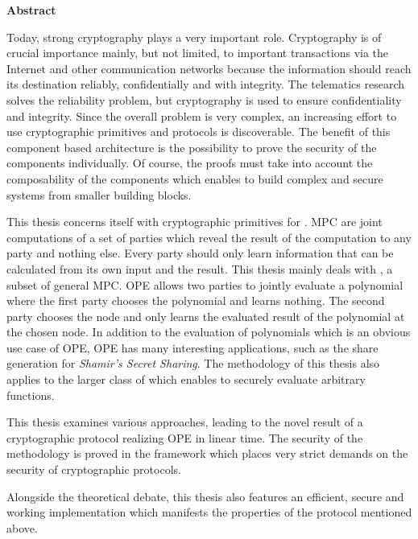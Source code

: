 \noindent{}\textsf{\textbf{\huge Abstract}}

\bigskip{}

\noindent{}Today, strong cryptography plays a very important role. Cryptography
is of crucial importance mainly, but not limited, to important transactions via
the Internet and other communication networks because the information should
reach its destination reliably, confidentially and with integrity. The
telematics research solves the reliability problem, but cryptography is used to
ensure confidentiality and integrity. Since the overall problem is very complex,
an increasing effort to use cryptographic primitives and protocols is
discoverable. The benefit of this component based architecture is the
possibility to prove the security of the components individually. Of course, the
proofs must take into account the composability of the components which enables
to build complex and secure systems from smaller building blocks.

This thesis concerns itself with cryptographic primitives for . MPC are joint computations of a set of parties
which reveal the result of the computation to any party and nothing else. Every
party should only learn information that can be calculated from its own input
and the result. This thesis mainly deals with , a subset of general MPC. OPE allows two parties to jointly
evaluate a polynomial where the first party chooses the polynomial and learns
nothing. The second party chooses the node and only learns the evaluated result
of the polynomial at the chosen node. In addition to the evaluation of
polynomials which is an obvious use case of OPE, OPE has many interesting
applications, such as the share generation for \emph{Shamir's Secret Sharing}.
The methodology of this thesis also applies to the larger class of
 which enables to securely evaluate
arbitrary functions.

This thesis examines various approaches, leading to the novel result of a
cryptographic protocol realizing OPE in linear time. The security of the
methodology is proved in the  framework
which places very strict demands on the security of cryptographic protocols.

Alongside the theoretical debate, this thesis also features an efficient, secure
and working implementation which manifests the properties of the protocol
mentioned above.

